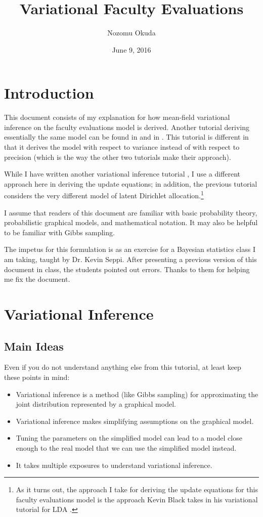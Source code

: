 \documentclass[12pt]{article}
\title{Variational Faculty Evaluations}
\author{Nozomu Okuda}
\date{June 9, 2016}
\begin{document}
\maketitle

\section{Introduction}

This document consists of my explanation for how mean-field variational
inference on the faculty evaluations model is derived.  Another tutorial
deriving essentially the same model can be found in \autocite{foxvartut} and in
\autocite{wikivar}.  This tutorial is different in that it derives the model
with respect to variance instead of with respect to precision (which is the way
the other two tutorials make their approach).

While I have written another variational inference tutorial \autocite{myvarlda},
I use a different approach here in deriving the update equations; in addition,
the previous tutorial considers the very different model of latent Dirichlet
allocation.\footnote{As it turns out, the approach I take for deriving the
update equations for this faculty evaluations model is the approach Kevin Black
takes in his variational tutorial for LDA \autocite{kb}.}

I assume that readers of this document are familiar with basic probability
theory, probabilistic graphical models, and mathematical notation.  It may also
be helpful to be familiar with Gibbs sampling.

The impetus for this formulation is as an exercise for a Bayesian statistics
class I am taking, taught by Dr. Kevin Seppi.  After presenting a previous
version of this document in class, the students pointed out errors.  Thanks to
them for helping me fix the document.

\section{Variational Inference}

\subsection{Main Ideas}

Even if you do not understand anything else from this tutorial, at least keep
these points in mind:

\begin{itemize}
    \item Variational inference is a method (like Gibbs sampling) for
        approximating the joint distribution represented by a graphical model.
    \item Variational inference makes simplifying assumptions on the graphical
        model.
    \item Tuning the parameters on the simplified model can lead to a model
        close enough to the real model that we can use the simplified model
        instead.
    \item It takes multiple exposures to understand variational inference.
\end{itemize}
\end{document}
